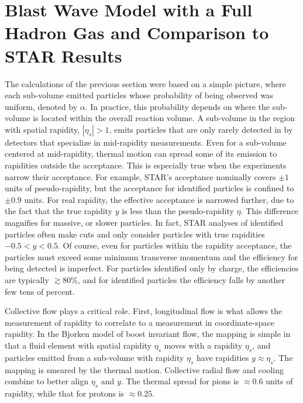 
\section{Blast Wave Model with a Full Hadron Gas and Comparison to STAR Results}\label{sec:blast}

The calculations of the previous section were based on a simple picture, where each sub-volume emitted particles whose probability of being observed was uniform, denoted by $\alpha$. In practice, this probability depends on where the sub-volume is located within the overall reaction volume. A sub-volume in the region with spatial rapidity, $|\eta_s|>1$, emits particles that are only rarely detected in by detectors that specialize in mid-rapidity measurements. Even for a sub-volume centered at mid-rapidity, thermal motion can spread some of its emission to rapidities outside the acceptance. This is especially true when the experiments narrow their acceptance. For example, STAR's acceptance nominally covers $\pm 1$ units of pseudo-rapidity, but the acceptance for identified particles is confined to $\pm 0.9$ units. For real rapidity, the effective acceptance is narrowed further, due to the fact that the true rapidity $y$ is less than the pseudo-rapidity $\eta$. This difference magnifies for massive, or slower particles. In fact, STAR analyses of identified particles often make cuts and only consider particles with true rapidities $-0.5<y<0.5$. Of course, even for particles within the rapidity acceptance, the particles must exceed some minimum transverse momentum and the efficiency for being detected is imperfect. For particles identified only by charge, the efficiencies are typically $\gtrsim 80\%$, and for identified particles the efficiency falls by another few tens of percent.

Collective flow plays a critical role. First, longitudinal flow is what allows the measurement of rapidity to correlate to a measurement in coordinate-space rapidity. In the Bjorken model of boost invariant flow, the mapping is simple in that a fluid element with spatial rapidity $\eta_s$ moves with a rapidity $\eta_s$, and particles emitted from a sub-volume with rapidity $\eta_s$ have rapidities $y\approx\eta_s$. The mapping is smeared by the thermal motion. Collective radial flow and cooling combine to better align $\eta_s$ and $y$. The thermal spread for pions is $\approx 0.6$ units of rapidity, while that for protons is $\approx 0.25$.

